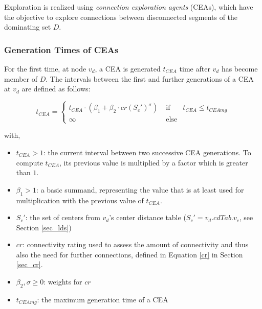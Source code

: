 Exploration is realized using \emph{connection exploration agents} (CEAs), which have the objective to explore connections between disconnected segments of the dominating set $D$.


\subsubsection{Generation Times of CEAs}\label{sec_gtoc} For the first time, at node $v_d$, a CEA is generated $t_{CEA}$ time after $v_d$ has become member of $D$. The intervals between the first and further generations of a CEA at $v_d$ are defined as follows: 

		\begin{equation}\label{tcea}
			t_{CEA} = \left\{ \begin{array}{rll}
			t_{CEA} \cdot (\beta_1 + \beta_2 \cdot cr(S_c')^\sigma) & \; \mbox{if} \; & t_{CEA} \leq t_{CEAmg} \\
			\infty & \; \mbox{else}
			\end{array}\right.
		\end{equation}

with, 

\begin{itemize}

	\item $t_{CEA} > 1$: the current interval between two 	successive CEA generations. To compute $t_{CEA}$, its previous value is multiplied by a factor which is greater than $1$.
	
	\item $\beta_1 > 1$: a basic summand, representing the value that is at least used for multiplication with the previous value of $t_{CEA}$. 
	
	\item $S_c'$: the set of centers from $v_d$'s center distance table ($S_c'=v_d.cdTab.v_c$, see Section \ref{sec_lds})
	
	\item $cr$: connectivity rating used to assess the amount of connectivity and thus also the need for further connections, defined in Equation \ref{cr} in Section \ref{sec_cr}.
	
	\item $\beta_2, \sigma \geq 0$: weights for $cr$
	
	\item $t_{CEAmg}$: the maximum generation time of a CEA

\end{itemize}

